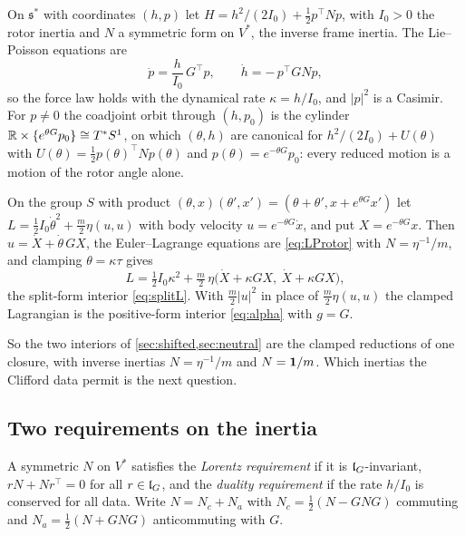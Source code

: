 \begin{proposition}
\label{prop:LP}
On $\mathfrak s^*$ with coordinates $(h,p)$ let $H=h^2/(2I_0)+\tfrac12p^{\!\top}Np$, with $I_0>0$ the rotor inertia and $N$ a symmetric form on
$V^*$, the inverse frame inertia. The Lie--Poisson equations are
\begin{equation}
\label{eq:LProtor}
\dot p=\frac h{I_0}\,G^{\!\top}p,\qquad \dot h=-\,p^{\!\top}GNp ,
\end{equation}
so the force law holds with the dynamical rate $\kappa=h/I_0$, and $|p|^2$ is a Casimir. For $p\neq0$ the coadjoint orbit through $(h,p_0)$ is the
cylinder $\mathbb{R}\times\{e^{\theta G}p_0\}\cong T^*S^1$, on which $(\theta,h)$ are canonical for $h^2/(2I_0)+U(\theta)$ with
$U(\theta)=\tfrac12p(\theta)^{\!\top}Np(\theta)$ and $p(\theta)=e^{-\theta G}p_0$: every reduced motion is a motion of the rotor angle alone.
\end{proposition}

\begin{proposition}
\label{prop:groupred}
On the group $S$ with product $(\theta,x)(\theta',x')=(\theta+\theta',x+e^{\theta G}x')$ let $L=\tfrac12I_0\dot\theta^2+\tfrac m2\eta(u,u)$ with body velocity
$u=e^{-\theta G}\dot x$, and put $X=e^{-\theta G}x$. Then $u=\dot X+\dot\theta\,GX$, the Euler--Lagrange equations are \eqref{eq:LProtor} with $N=\eta^{-1}/m$,
and clamping $\theta=\kappa\tau$ gives
\[
L=\tfrac12I_0\kappa^2+\tfrac m2\,\eta\bigl(\dot X+\kappa GX,\ \dot X+\kappa GX\bigr),
\]
the split-form interior \eqref{eq:splitL}. With $\tfrac m2|u|^2$ in place of $\tfrac m2\eta(u,u)$ the clamped Lagrangian is the positive-form interior
\eqref{eq:alpha} with $g=G$.
\end{proposition}

So the two interiors of \cref{sec:shifted,sec:neutral} are the clamped reductions of one closure, with inverse inertias $N=\eta^{-1}/m$ and
$N=\mathbf 1/m$. Which inertias the Clifford data permit is the next question.

\subsection{Two requirements on the inertia}

\begin{definition}
\label{def:inertiareq}
A symmetric $N$ on $V^*$ satisfies the \emph{Lorentz requirement} if it is $\mathfrak l_G$-invariant, $rN+Nr^{\!\top}=0$ for all $r\in\mathfrak l_G$, and the
\emph{duality requirement} if the rate $h/I_0$ is conserved for all data. Write $N=N_c+N_a$ with $N_c=\tfrac12(N-GNG)$ commuting and
$N_a=\tfrac12(N+GNG)$ anticommuting with $G$.
\end{definition}

